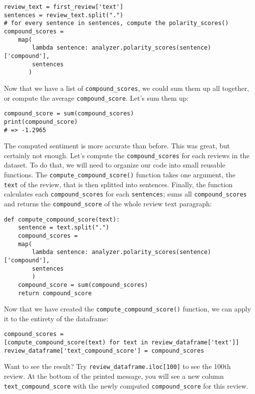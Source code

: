 	\begin{Verbatim}
review_text = first_review['text']
sentences = review_text.split(".")
# for every sentence in sentences, compute the polarity_scores()
compound_scores =
	map(
		lambda sentence: analyzer.polarity_scores(sentence)['compound'],
		sentences
	   )
	\end{Verbatim}
	Now that we have a list of \verb|compound_scores|, we could sum them up all together, or compute the average \verb|compound_score|. Let's sum them up:
	\begin{Verbatim}
compound_score = sum(compound_scores)
print(compound_score)
# => -1.2965
	\end{Verbatim}
	The computed sentiment is more accurate than before. This was great, but certainly not enough. Let's compute the \verb|compound_scores| for each reviews in the dataset. To do that, we will need to organize our code into small reusable functions. The \verb|compute_compound_score()| function takes one argument, the \verb|text| of the review, that is then splitted into sentences. Finally, the function calculates each \verb|compound_scores| for each \verb|sentences|; sums all \verb|compound_scores| and returns the \verb|compound_score| of the whole review text paragraph:
	\begin{Verbatim}
def compute_compound_score(text):
	sentence = text.split(".")
	compound_scores =
	map(
		lambda sentence: analyzer.polarity_scores(sentence)['compound'],
		sentences
		)
	compound_score = sum(compound_scores)
	return compound_score
	\end{Verbatim}
	Now that we have created the \verb|compute_compound_score()| function, we can apply it to the entirety of the dataframe:
	\begin{Verbatim}
compound_scores =
[compute_compound_score(text) for text in review_dataframe['text']]
review_dataframe['text_compound_score'] = compound_scores
	\end{Verbatim}
	Want to see the result? Try \verb|review_dataframe.iloc[100]| to see the 100th review. At the bottom of the printed message, you will see a new column \verb|text_compound_score| with the newly computed \verb|compound_score| for this review.

